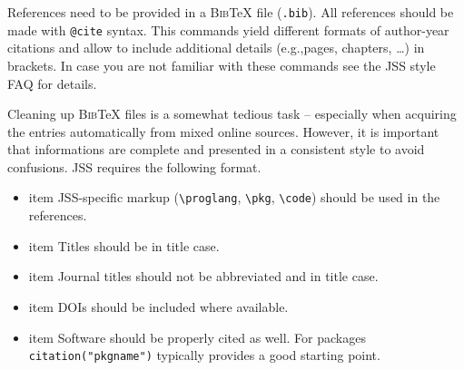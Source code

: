 \documentclass[
  nojss,
  article]{jss}
\providecommand{\tightlist}{%
  \setlength{\itemsep}{0pt}\setlength{\parskip}{0pt}}
\begin{document}
\begin{tcolorbox}[enhanced jigsaw, bottomrule=.15mm, breakable, toprule=.15mm, opacityback=0, colframe=quarto-callout-color-frame, left=2mm, rightrule=.15mm, arc=.35mm, leftrule=.75mm, colback=white]

References need to be provided in a \textsc{Bib}{\TeX} file
(\texttt{.bib}). All references should be made with \texttt{@cite}
syntax. This commands yield different formats of author-year citations
and allow to include additional details (e.g.,pages, chapters, \dots) in
brackets. In case you are not familiar with these commands see the JSS
style FAQ for details.

Cleaning up \textsc{Bib}{\TeX} files is a somewhat tedious task --
especially when acquiring the entries automatically from mixed online
sources. However, it is important that informations are complete and
presented in a consistent style to avoid confusions. JSS requires the
following format.

\begin{itemize}
\tightlist
\item
  item JSS-specific markup (\texttt{\textbackslash{}proglang},
  \texttt{\textbackslash{}pkg}, \texttt{\textbackslash{}code}) should be
  used in the references.
\item
  item Titles should be in title case.
\item
  item Journal titles should not be abbreviated and in title case.
\item
  item DOIs should be included where available.
\item
  item Software should be properly cited as well. For 
  packages \texttt{citation("pkgname")} typically provides a good
  starting point.
\end{itemize}

\end{tcolorbox}
\end{document}
